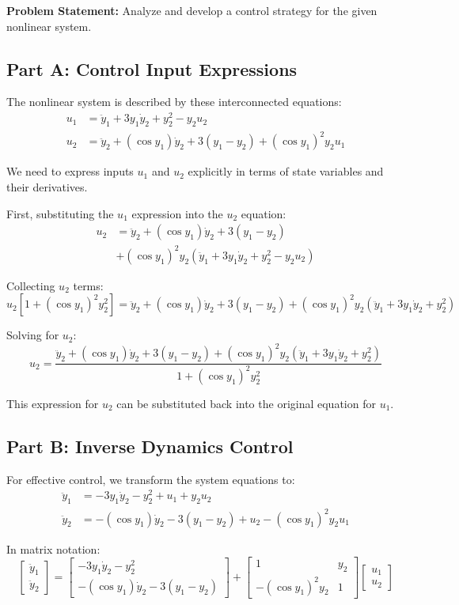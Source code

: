 \documentclass{article}
\begin{document}
\textbf{Problem Statement:} Analyze and develop a control strategy for the given nonlinear system.

\subsection*{Part A: Control Input Expressions}

The nonlinear system is described by these interconnected equations:
\begin{align}
u_1 &= \ddot{y}_1 + 3y_1\dot{y}_2 + y_2^2 - y_2 u_2 \\
u_2 &= \ddot{y}_2 + (\cos y_1)\dot{y}_2 + 3(y_1 - y_2) + (\cos y_1)^2 y_2 u_1
\end{align}

We need to express inputs $u_1$ and $u_2$ explicitly in terms of state variables and their derivatives.

First, substituting the $u_1$ expression into the $u_2$ equation:
\begin{align}
u_2 &= \ddot{y}_2 + (\cos y_1)\dot{y}_2 + 3(y_1 - y_2) \\
&+ (\cos y_1)^2 y_2 (\ddot{y}_1 + 3y_1\dot{y}_2 + y_2^2 - y_2 u_2)
\end{align}

Collecting $u_2$ terms:
\[
u_2[1 + (\cos y_1)^2 y_2^2] = \ddot{y}_2 + (\cos y_1)\dot{y}_2 + 3(y_1 - y_2) + (\cos y_1)^2 y_2 (\ddot{y}_1 + 3y_1\dot{y}_2 + y_2^2)
\]

Solving for $u_2$:
\[
u_2 = \frac{\ddot{y}_2 + (\cos y_1)\dot{y}_2 + 3(y_1 - y_2) + (\cos y_1)^2 y_2 (\ddot{y}_1 + 3y_1\dot{y}_2 + y_2^2)}{1 + (\cos y_1)^2 y_2^2}
\]

This expression for $u_2$ can be substituted back into the original equation for $u_1$.

\subsection*{Part B: Inverse Dynamics Control}

For effective control, we transform the system equations to:
\begin{align}
\ddot{y}_1 &= -3y_1\dot{y}_2 - y_2^2 + u_1 + y_2 u_2 \\
\ddot{y}_2 &= -(\cos y_1)\dot{y}_2 - 3(y_1 - y_2) + u_2 - (\cos y_1)^2 y_2 u_1
\end{align}

In matrix notation:
\[
\begin{bmatrix} \ddot{y}_1 \\ \ddot{y}_2 \end{bmatrix} = \begin{bmatrix} -3y_1\dot{y}_2 - y_2^2 \\ -(\cos y_1)\dot{y}_2 - 3(y_1 - y_2) \end{bmatrix} + \begin{bmatrix} 1 & y_2 \\ -(\cos y_1)^2 y_2 & 1 \end{bmatrix} \begin{bmatrix} u_1 \\ u_2 \end{bmatrix}
\]
\end{document}
